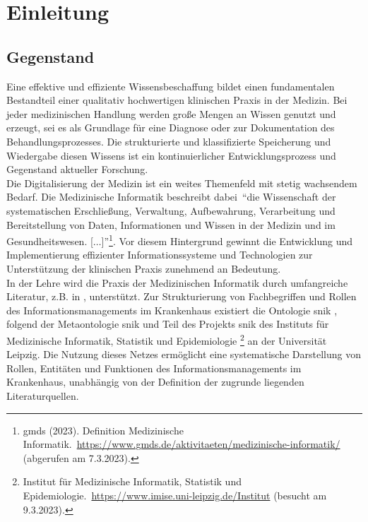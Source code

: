 \chapter{Einleitung}\label{ch:introduction}
\section{Gegenstand}\label{sec:gegenstand}
Eine effektive und effiziente Wissensbeschaffung bildet einen fundamentalen Bestandteil einer qualitativ hochwertigen klinischen Praxis in der Medizin.
Bei jeder medizinischen Handlung werden große Mengen an Wissen genutzt und erzeugt, sei es als Grundlage für eine Diagnose oder zur Dokumentation des Behandlungsprozesses.
Die strukturierte und klassifizierte Speicherung und Wiedergabe diesen Wissens ist ein kontinuierlicher Entwicklungsprozess und Gegenstand aktueller Forschung.\\

Die Digitalisierung der Medizin ist ein weites Themenfeld mit stetig wachsendem Bedarf.
Die Medizinische Informatik beschreibt dabei~\enquote{die Wissenschaft der systematischen Erschließung, Verwaltung, Aufbewahrung, Verarbeitung und Bereitstellung von Daten, Informationen und Wissen in der Medizin und im Gesundheitswesen. [$\dots$]}\footnote{\raggedright{}\ac{gmds} (2023). Definition Medizinische Informatik.\ \url{https://www.gmds.de/aktivitaeten/medizinische-informatik/} (abgerufen am 7.3.2023).}.
Vor diesem Hintergrund gewinnt die Entwicklung und Implementierung effizienter Informationssysteme und Technologien zur Unterstützung der klinischen Praxis zunehmend an Bedeutung.\\

In der Lehre wird die Praxis der Medizinischen Informatik durch umfangreiche Literatur, z.B. in \citet{bb}, unterstützt.
Zur Strukturierung von Fachbegriffen und Rollen des Informationsmanagements im Krankenhaus existiert die Ontologie \ac{snik} \citep{semantischesnetz}, folgend der Metaontologie \ac{snik} und Teil des Projekts \ac{snik} des Instituts für Medizinische Informatik, Statistik und Epidemiologie%
\footnote{\raggedright{}Institut für Medizinische Informatik, Statistik und Epidemiologie.\ \url{https://www.imise.uni-leipzig.de/Institut} (besucht am 9.3.2023).} an der Universität Leipzig.
Die Nutzung dieses Netzes ermöglicht eine systematische Darstellung von Rollen, Entitäten und Funktionen des Informationsmanagements im Krankenhaus, unabhängig von der Definition der zugrunde liegenden Literaturquellen.\\


